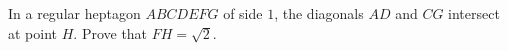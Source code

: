 \problem{}
In a regular heptagon $ABCDEFG$ of side $1$, the diagonals $AD$ and $CG$ intersect at
point $H$.
Prove that $FH = \sqrt{2}$.
\solution
\endproblem
